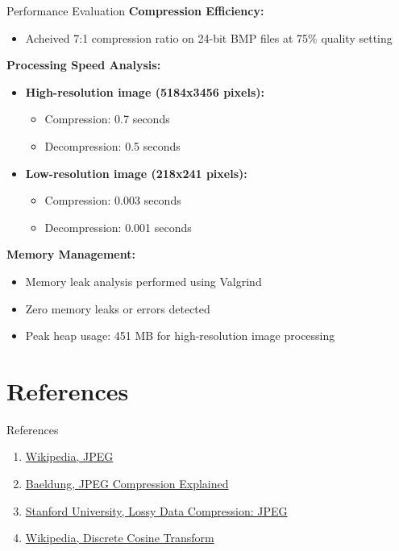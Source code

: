 \documentclass[10pt]{beamer}
\begin{document}
\begin{frame}{Performance Evaluation}
    \textbf{Compression Efficiency:}
    \begin{itemize}
     \item Acheived 7:1 compression ratio on 24-bit BMP files at 75\% quality setting
    \end{itemize}

    \vspace{0.3cm}

    \textbf{Processing Speed Analysis:}
    \begin{itemize}
     \item \textbf{High-resolution image (5184x3456 pixels):}
     \begin{itemize}
      \item Compression: 0.7 seconds
      \item Decompression: 0.5 seconds
     \end{itemize}

     \item \textbf{Low-resolution image (218x241 pixels):}
     \begin{itemize}
      \item Compression: 0.003 seconds
      \item Decompression: 0.001 seconds
     \end{itemize}
    \end{itemize}

    \vspace{0.3cm}

    \textbf{Memory Management:}
    \begin{itemize}
     \item Memory leak analysis performed using Valgrind
     \item Zero memory leaks or errors detected
     \item Peak heap usage: 451 MB for high-resolution image processing
    \end{itemize}
\end{frame}

\section{References}

\begin{frame}{References}
    \footnotesize
    \begin{enumerate}
     \item \href{https://en.wikipedia.org/wiki/JPEG}{Wikipedia, JPEG}
     \item \href{https://www.baeldung.com/cs/jpeg-compression}{Baeldung, JPEG Compression Explained}
     \item \href{https://cs.stanford.edu/people/eroberts/courses/soco/projects/data-compression/lossy/jpeg/index.htm}{Stanford University, Lossy Data Compression: JPEG}
     \item \href{https://en.wikipedia.org/wiki/Discrete_cosine_transform}{Wikipedia, Discrete Cosine Transform}
    \end{enumerate}

\end{frame}
\end{document}
